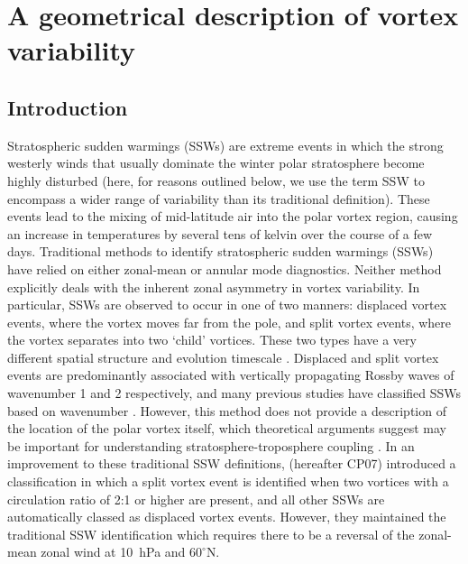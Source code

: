 \chapter{A geometrical description of vortex variability}
\label{cha:moments}



\section{Introduction}
Stratospheric sudden warmings (SSWs) are extreme events in which the strong
westerly winds that usually dominate the winter polar stratosphere become highly
disturbed (here, for reasons outlined below, we use the term SSW to encompass a
wider range of variability than its traditional definition). These events lead
to the mixing of mid-latitude air into the polar vortex region, causing an
increase in temperatures by several tens of kelvin over the course of a few
days. Traditional methods to identify stratospheric sudden warmings (SSWs) have
relied on either zonal-mean \citep{Andrews1987} or annular mode
\citep{Baldwin2001a} diagnostics. Neither method explicitly deals with the
inherent zonal asymmetry in vortex variability. In particular, SSWs are observed
to occur in one of two manners: displaced vortex events, where the vortex moves
far from the pole, and split vortex events, where the vortex separates into two
`child' vortices. These two types have a very different spatial structure and
evolution timescale \citep{Matthewman2009}. Displaced and split vortex events
are predominantly associated with vertically propagating Rossby waves of
wavenumber 1 and 2 respectively, and many previous studies have classified SSWs
based on wavenumber \citep[e.g.][]{Nakagawa2006}. However, this method does not
provide a description of the location of the polar vortex itself, which
theoretical arguments suggest may be important for understanding
stratosphere-troposphere coupling \citep{Ambaum2002}. In an improvement to these
traditional SSW definitions, \citet{Charlton2007a} (hereafter CP07) introduced a
classification in which a split vortex event is identified when two vortices
with a circulation ratio of 2:1 or higher are present, and all other SSWs are
automatically classed as displaced vortex events. However, they maintained the
traditional SSW identification which requires there to be a reversal of the
zonal-mean zonal wind at 10~hPa and $60^{\circ}$N.

